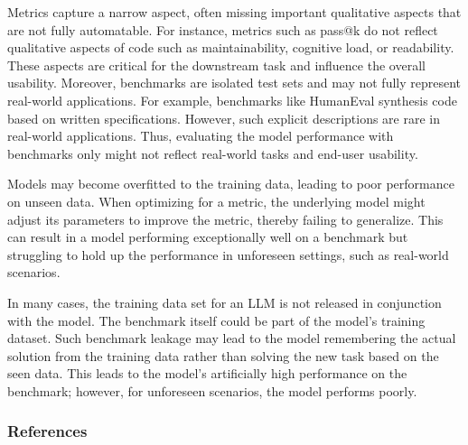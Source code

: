 \documentclass[11pt]{article}
\begin{document}
Metrics capture a narrow aspect, often missing important qualitative aspects that are not fully automatable.
For instance, metrics such as pass@k do not reflect qualitative aspects of code such as maintainability, cognitive load, or readability.
These aspects are critical for the downstream task and influence the overall usability.
Moreover, benchmarks are isolated test sets and may not fully represent real-world applications.
For example, benchmarks like HumanEval synthesis code based on written specifications.
However, such explicit descriptions are rare in real-world applications.
Thus, evaluating the model performance with benchmarks only might not reflect real-world tasks and end-user usability.

Models may become overfitted to the training data, leading to poor performance on unseen data.
When optimizing for a metric, the underlying model might adjust its parameters to improve the metric, thereby failing to generalize.
This can result in a model performing exceptionally well on a benchmark but struggling to hold up the performance in unforeseen settings, such as real-world scenarios.

In many cases, the training data set for an LLM is not released in conjunction with the model.
The benchmark itself could be part of the model's training dataset.
Such benchmark leakage may lead to the model remembering the actual solution from the training data rather than solving the new task based on the seen data.
This leads to the model's artificially high performance on the benchmark; however, for unforeseen scenarios, the model performs poorly.

\subsubsection{References}



\end{document}
